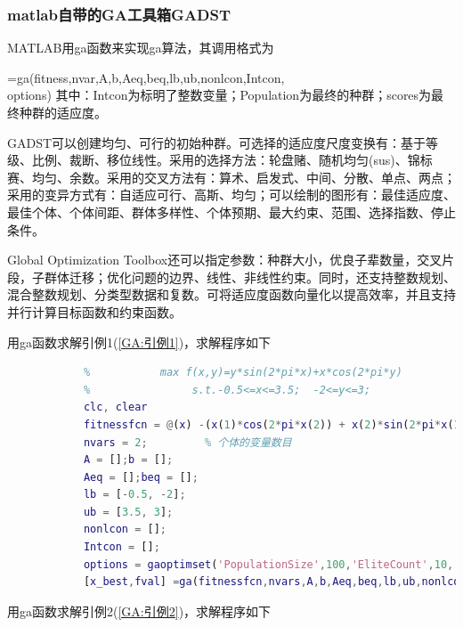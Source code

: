         \subsubsection{matlab自带的GA工具箱GADST}
            \par
            MATLAB用ga函数来实现ga算法，其调用格式为
            \par
            [x,fval,exitflag,output,population,scores]=ga(fitness,nvar,A,b,Aeq,beq,lb,ub,nonlcon,Intcon,\\options)
            其中：Intcon为标明了整数变量；Population为最终的种群；scores为最终种群的适应度。
            \par
            GADST可以创建均匀、可行的初始种群。可选择的适应度尺度变换有：基于等级、比例、裁断、移位线性。采用的选择方法：轮盘赌、随机均匀(sus)、锦标赛、均匀、余数。采用的交叉方法有：算术、启发式、中间、分散、单点、两点；采用的变异方式有：自适应可行、高斯、均匀；可以绘制的图形有：最佳适应度、最佳个体、个体间距、群体多样性、个体预期、最大约束、范围、选择指数、停止条件。
            \par
            Global Optimization Toolbox还可以指定参数：种群大小，优良子辈数量，交叉片段，子群体迁移；优化问题的边界、线性、非线性约束。同时，还支持整数规划、混合整数规划、分类型数据和复数。可将适应度函数向量化以提高效率，并且支持并行计算目标函数和约束函数。
            \par
            用ga函数求解引例1(\ref{GA:引例1})，求解程序如下
            \begin{lstlisting}[language = Matlab]
            %% matlab自带的GA求解“智能优化引例”
            %           max f(x,y)=y*sin(2*pi*x)+x*cos(2*pi*y)
            %                s.t.-0.5<=x<=3.5;  -2<=y<=3;
            clc, clear
            fitnessfcn = @(x) -(x(1)*cos(2*pi*x(2)) + x(2)*sin(2*pi*x(1)));       % 适应度函数句柄
            nvars = 2;         % 个体的变量数目
            A = [];b = [];
            Aeq = [];beq = [];
            lb = [-0.5, -2];
            ub = [3.5, 3];
            nonlcon = [];
            Intcon = [];
            options = gaoptimset('PopulationSize',100,'EliteCount',10,'CrossoverFraction',0.75,'Generations',500,'StallGenLimit',500,'TolFun',1e-100,'PlotFcns',{@gaplotbestf,@gaplotbestindiv}); % 参数设置
            [x_best,fval] =ga(fitnessfcn,nvars,A,b,Aeq,beq,lb,ub,nonlcon,Intcon,options);   % 调用ga函数
            \end{lstlisting}
            \par
            用ga函数求解引例2(\ref{GA:引例2})，求解程序如下
